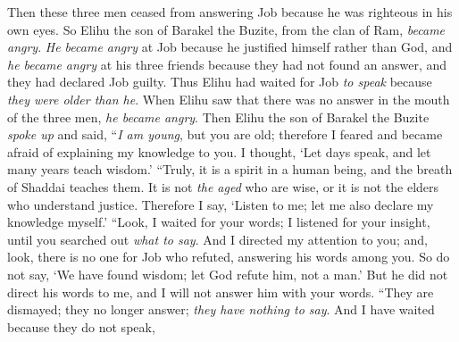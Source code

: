 \begin{biblechapter} %
 Then these three men ceased from answering Job because he was righteous in his own eyes.
\verse So Elihu the son of Barakel the Buzite, from the clan of Ram, \textit{became angry}. \textit{He became angry} at Job because he justified himself rather than God,
\verse and \textit{he became angry} at his three friends because they had not found an answer, and they had declared Job guilty.
\verse Thus Elihu had waited for Job \textit{to speak} because \textit{they were older than he}.
\verse When Elihu saw that there was no answer in the mouth of the three men, \textit{he became angry}.
\verse Then Elihu the son of Barakel the Buzite \textit{spoke up} and said,
\verse “\textit{I am young}, but you are old; 
therefore I feared and became afraid of explaining my knowledge to you.
\verse I thought, ‘Let days speak, 
and let many years teach wisdom.’
\verse “Truly, it is a spirit in a human being, 
and the breath of Shaddai teaches them.
\verse It is not \textit{the aged} who are wise, 
or it is not the elders who understand justice.
\verse Therefore I say, ‘Listen to me; 
let me also declare my knowledge myself.’
\verse “Look, I waited for your words; 
I listened for your insight, 
until you searched out \textit{what to say}.
\verse And I directed my attention to you; 
and, look, there is no one for Job who refuted, 
answering his words among you.
\verse So do not say, ‘We have found wisdom; 
let God refute him, not a man.’
\verse But he did not direct his words to me, 
and I will not answer him with your words.
\verse “They are dismayed; they no longer answer; 
\textit{they have nothing to say}.
\verse And I have waited because they do not speak, 

\end{biblechapter}

